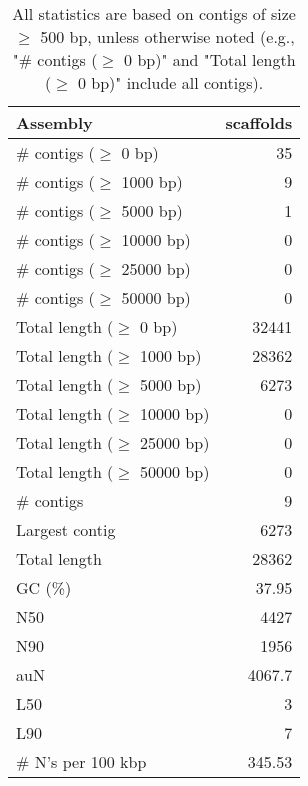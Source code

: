 \documentclass[12pt,a4paper]{article}
\begin{document}
\begin{table}[ht]
\begin{center}
\caption{All statistics are based on contigs of size $\geq$ 500 bp, unless otherwise noted (e.g., "\# contigs ($\geq$ 0 bp)" and "Total length ($\geq$ 0 bp)" include all contigs).}
\begin{tabular}{|l*{1}{|r}|}
\hline
Assembly & scaffolds \\ \hline
\# contigs ($\geq$ 0 bp) & 35 \\ \hline
\# contigs ($\geq$ 1000 bp) & 9 \\ \hline
\# contigs ($\geq$ 5000 bp) & 1 \\ \hline
\# contigs ($\geq$ 10000 bp) & 0 \\ \hline
\# contigs ($\geq$ 25000 bp) & 0 \\ \hline
\# contigs ($\geq$ 50000 bp) & 0 \\ \hline
Total length ($\geq$ 0 bp) & 32441 \\ \hline
Total length ($\geq$ 1000 bp) & 28362 \\ \hline
Total length ($\geq$ 5000 bp) & 6273 \\ \hline
Total length ($\geq$ 10000 bp) & 0 \\ \hline
Total length ($\geq$ 25000 bp) & 0 \\ \hline
Total length ($\geq$ 50000 bp) & 0 \\ \hline
\# contigs & 9 \\ \hline
Largest contig & 6273 \\ \hline
Total length & 28362 \\ \hline
GC (\%) & 37.95 \\ \hline
N50 & 4427 \\ \hline
N90 & 1956 \\ \hline
auN & 4067.7 \\ \hline
L50 & 3 \\ \hline
L90 & 7 \\ \hline
\# N's per 100 kbp & 345.53 \\ \hline
\end{tabular}
\end{center}
\end{table}
\end{document}
